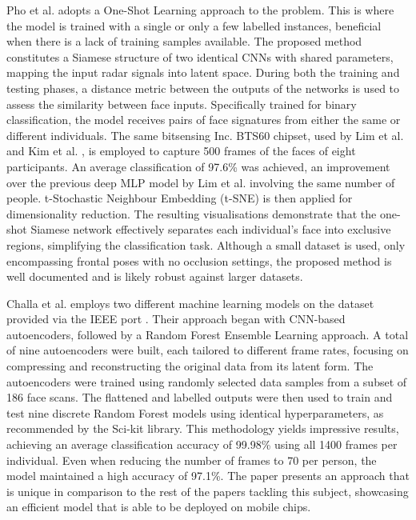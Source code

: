 \documentclass{mpaper}
\begin{document}
Pho et al. \cite{pho2021radar} adopts a One-Shot Learning approach to the problem. This is where the model is trained with a single or only a few labelled instances, beneficial when there is a lack of training samples available. The proposed method constitutes a Siamese structure of two identical CNNs with shared parameters, mapping the input radar signals into latent space. During both the training and testing phases, a distance metric between the outputs of the networks is used to assess the similarity between face inputs. Specifically trained for binary classification, the model receives pairs of face signatures from either the same or different individuals. The same bitsensing Inc. BTS60 chipset, used by Lim et al. and Kim et al. \cite{lim2020dnn, kim2020face}, is employed to capture 500 frames of the faces of eight participants. An average classification of 97.6\% was achieved, an improvement over the previous deep MLP model by Lim et al. involving the same number of people. t-Stochastic Neighbour Embedding (t-SNE) \cite{van2008visualizing} is then applied for dimensionality reduction. The resulting visualisations demonstrate that the one-shot Siamese network effectively separates each individual's face into exclusive regions, simplifying the classification task. Although a small dataset is used, only encompassing frontal poses with no occlusion settings, the proposed method is well documented and is likely robust against larger datasets.

\newpage
Challa et al. \cite{challa2021face} employs two different machine learning models on the dataset provided via the IEEE port \cite{mmwavefacedata}. Their approach began with CNN-based autoencoders, followed by a Random Forest Ensemble Learning approach. A total of nine autoencoders were built, each tailored to different frame rates, focusing on compressing and reconstructing the original data from its latent form. The autoencoders were trained using randomly selected data samples from a subset of 186 face scans. The flattened and labelled outputs were then used to train and test nine discrete Random Forest models using identical hyperparameters, as recommended by the Sci-kit library. This methodology yields impressive results, achieving an average classification accuracy of 99.98\% using all 1400 frames per individual. Even when reducing the number of frames to 70 per person, the model maintained a high accuracy of 97.1\%. The paper presents an approach that is unique in comparison to the rest of the papers tackling this subject, showcasing an efficient model that is able to be deployed on mobile chips.
\end{document}
